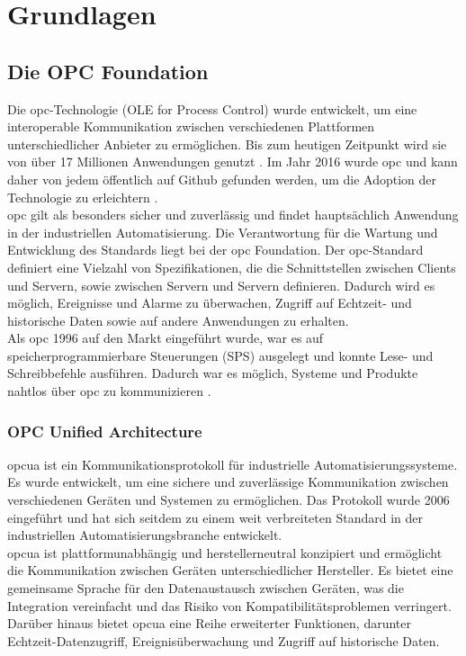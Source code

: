 
\chapter{Grundlagen}
\section{Die OPC Foundation}
Die \ac{opc}-Technologie (OLE for Process Control) wurde entwickelt, um eine interoperable Kommunikation zwischen verschiedenen Plattformen unterschiedlicher Anbieter zu ermöglichen. Bis zum heutigen Zeitpunkt wird sie von über 17 Millionen Anwendungen genutzt \cite{OPCFoundation.15.06.2017}. Im Jahr 2016 wurde \ac{opc} und kann daher von jedem öffentlich auf Github gefunden werden, um die Adoption der Technologie zu erleichtern \cite{OPCFoundation.15.06.2017}.\\

\ac{opc} gilt als besonders sicher und zuverlässig und findet hauptsächlich Anwendung in der industriellen Automatisierung. Die Verantwortung für die Wartung und Entwicklung des Standards liegt bei der \ac{opc} Foundation. Der \ac{opc}-Standard definiert eine Vielzahl von Spezifikationen, die die Schnittstellen zwischen Clients und Servern, sowie zwischen Servern und Servern definieren. Dadurch wird es möglich, Ereignisse und Alarme zu überwachen, Zugriff auf Echtzeit- und historische Daten sowie auf andere Anwendungen zu erhalten.\\

Als \ac{opc} 1996 auf den Markt eingeführt wurde, war es auf speicherprogrammierbare Steuerungen (SPS) ausgelegt und konnte Lese- und Schreibbefehle ausführen. Dadurch war es möglich, Systeme und Produkte nahtlos über \ac{opc} zu kommunizieren \cite{OPCFoundation.15.06.2017}.

\subsection{OPC Unified Architecture}

\ac{opcua} ist ein Kommunikationsprotokoll für industrielle Automatisierungssysteme. Es wurde entwickelt, um eine sichere und zuverlässige Kommunikation zwischen verschiedenen Geräten und Systemen zu ermöglichen. Das Protokoll wurde 2006 eingeführt und hat sich seitdem zu einem weit verbreiteten Standard in der industriellen Automatisierungsbranche entwickelt.\\

\ac{opcua} ist plattformunabhängig und herstellerneutral konzipiert und ermöglicht die Kommunikation zwischen Geräten unterschiedlicher Hersteller. Es bietet eine gemeinsame Sprache für den Datenaustausch zwischen Geräten, was die Integration vereinfacht und das Risiko von Kompatibilitätsproblemen verringert. Darüber hinaus bietet \ac{opcua} eine Reihe erweiterter Funktionen, darunter Echtzeit-Datenzugriff, Ereignisüberwachung und Zugriff auf historische Daten.\\

